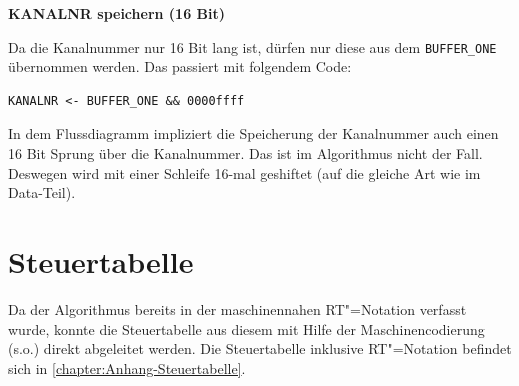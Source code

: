 \textbf{KANALNR speichern (16 Bit)}

Da die Kanalnummer nur 16 Bit lang ist, dürfen nur diese aus dem \texttt{BUFFER\_ONE} übernommen werden. Das passiert mit folgendem Code:

\begin{verbatim}
KANALNR <- BUFFER_ONE && 0000ffff
\end{verbatim}

In dem Flussdiagramm impliziert die Speicherung der Kanalnummer auch einen 16 Bit Sprung über die Kanalnummer. Das ist im Algorithmus nicht der Fall. Deswegen wird mit einer Schleife 16-mal geshiftet (auf die gleiche Art wie im Data-Teil).





\section{Steuertabelle}
\label{section:Dokumentation-Implementierung-Steuertabelle}

Da der Algorithmus bereits in der maschinennahen RT"=Notation verfasst wurde, konnte die Steuertabelle aus diesem mit Hilfe der Maschinencodierung (s.o.) direkt abgeleitet werden. Die Steuertabelle inklusive RT"=Notation befindet sich in \autoref{chapter:Anhang-Steuertabelle}.

